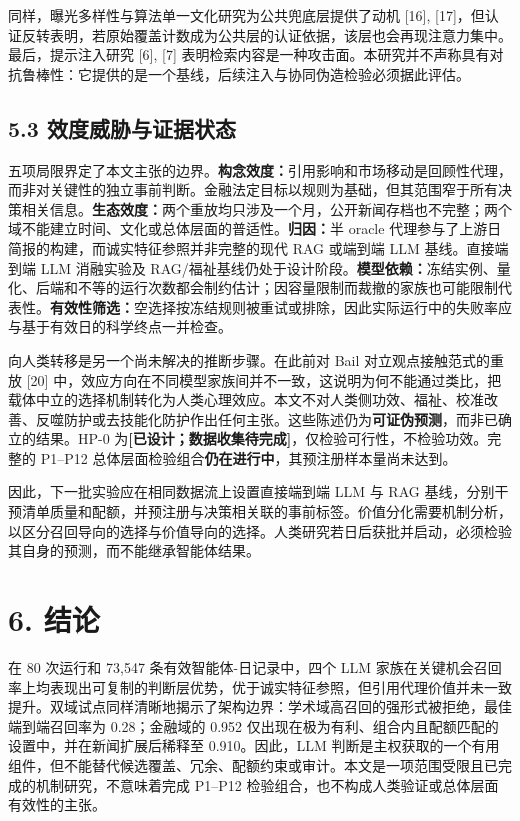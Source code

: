 \documentclass[
  chinese,
  conference,10pt]{IEEEtran}
\begin{document}
同样，曝光多样性与算法单一文化研究为公共兜底层提供了动机 {[}16{]}, {[}17{]}，但认证反转表明，若原始覆盖计数成为公共层的认证依据，该层也会再现注意力集中。最后，提示注入研究 {[}6{]}, {[}7{]} 表明检索内容是一种攻击面。本研究并不声称具有对抗鲁棒性：它提供的是一个基线，后续注入与协同伪造检验必须据此评估。

\subsection{5.3 效度威胁与证据状态}\label{ux6548ux5ea6ux5a01ux80c1ux4e0eux8bc1ux636eux72b6ux6001}

五项局限界定了本文主张的边界。\textbf{构念效度：}引用影响和市场移动是回顾性代理，而非对关键性的独立事前判断。金融法定目标以规则为基础，但其范围窄于所有决策相关信息。\textbf{生态效度：}两个重放均只涉及一个月，公开新闻存档也不完整；两个域不能建立时间、文化或总体层面的普适性。\textbf{归因：}半 oracle 代理参与了上游日简报的构建，而诚实特征参照并非完整的现代 RAG 或端到端 LLM 基线。直接端到端 LLM 消融实验及 RAG/福祉基线仍处于设计阶段。\textbf{模型依赖：}冻结实例、量化、后端和不等的运行次数都会制约估计；因容量限制而裁撤的家族也可能限制代表性。\textbf{有效性筛选：}空选择按冻结规则被重试或排除，因此实际运行中的失败率应与基于有效日的科学终点一并检查。

向人类转移是另一个尚未解决的推断步骤。在此前对 Bail 对立观点接触范式的重放 {[}20{]} 中，效应方向在不同模型家族间并不一致，这说明为何不能通过类比，把载体中立的选择机制转化为人类心理效应。本文不对人类侧功效、福祉、校准改善、反噬防护或去技能化防护作出任何主张。这些陈述仍为\textbf{可证伪预测}，而非已确立的结果。HP-0 为\textbf{{[}已设计；数据收集待完成{]}}，仅检验可行性，不检验功效。完整的 P1--P12 总体层面检验组合\textbf{仍在进行中}，其预注册样本量尚未达到。

因此，下一批实验应在相同数据流上设置直接端到端 LLM 与 RAG 基线，分别干预清单质量和配额，并预注册与决策相关联的事前标签。价值分化需要机制分析，以区分召回导向的选择与价值导向的选择。人类研究若日后获批并启动，必须检验其自身的预测，而不能继承智能体结果。

\section{6. 结论}\label{ux7ed3ux8bba}

在 80 次运行和 73,547 条有效智能体-日记录中，四个 LLM 家族在关键机会召回率上均表现出可复制的判断层优势，优于诚实特征参照，但引用代理价值并未一致提升。双域试点同样清晰地揭示了架构边界：学术域高召回的强形式被拒绝，最佳端到端召回率为 0.28；金融域的 0.952 仅出现在极为有利、组合内且配额匹配的设置中，并在新闻扩展后稀释至 0.910。因此，LLM 判断是主权获取的一个有用组件，但不能替代候选覆盖、冗余、配额约束或审计。本文是一项范围受限且已完成的机制研究，不意味着完成 P1--P12 检验组合，也不构成人类验证或总体层面有效性的主张。
\end{document}
